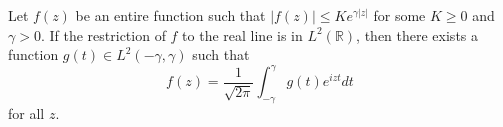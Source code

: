 \documentclass[12pt]{article}
\begin{document}
Let $f(z)$ be an entire function such that $\vert f(z)\vert \leq K
e^{\gamma \vert z\vert}$ for some $K \geq 0$ and
$\gamma > 0$. If the restriction of $f$ to the real line
is in $L^2(\mathbb{R})$, then there exists a function  
$g(t)\in L^2(-\gamma, \gamma)$ such that
$$ f(z) = \frac{1}{\sqrt{2\pi}}\int_{-\gamma}^{\gamma}g(t)e^{izt}dt$$
for all $z$. 
\end{document}
